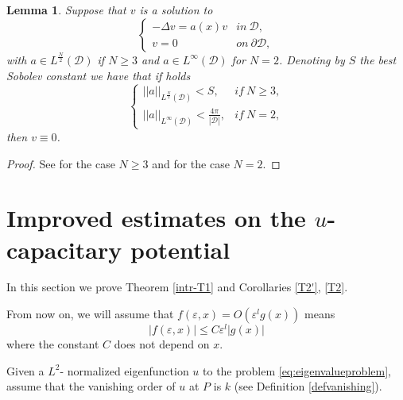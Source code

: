 \documentclass[11pt,reqno]{article}
\newtheorem{lemma}[teo]{Lemma}
\numberwithin{equation}{section}
\newcommand\e\varepsilon
\begin{document}
	\begin{lemma}\label{sml}
		Suppose that  $v$ is a solution to
		\begin{equation*}
			\begin{cases}
				-\Delta v=a(x)v&in\ \mathcal{D},\\
				v=0&on\ \partial \mathcal{D},
			\end{cases}  
		\end{equation*}
		with $a\in L^\frac N2(\mathcal{D})$ if $N\ge3$ and $a\in L^\infty(\mathcal{D})$ for $N=2$. Denoting by $S$ the best Sobolev constant we have that if holds
		\begin{equation*}
			\begin{cases}
				||a||_{L^\frac N2(\mathcal{D})}<S,&if\ N\ge3,\\
				||a||_{L^\infty(\mathcal{D})}<\frac{4\pi}{|\mathcal{D}|},&if\ N=2,
			\end{cases}  
		\end{equation*}
		then $v\equiv0$.
	\end{lemma}
	\begin{proof}
		See  \cite[Lemma 2.5]{GrossiMolle} for the case $N\ge3$ and   \cite[Theorem 4.1]{DeCarliHudson} for the case $N=2$. 
	\end{proof}




	\section{Improved estimates on the $u$-capacitary potential}\label{sec-Vu}
In this section we prove Theorem \ref{intr-T1} and Corollaries \ref{T2'}, \ref{T2}.

From now on, we will assume that $f(\e,x)=O(\e^lg(x) )$ means
$$|f(\e,x)|\le C\e^l|g(x)|$$
where the constant $C$ does not depend on $x$.
    
	Given a $L^2$- normalized eigenfunction $u$ to the problem \eqref{eq:eigenvalueproblem},  assume that the vanishing order of $u$ at $P$ is $k$
     (see Definition \ref{defvanishing}).
  
\end{document}
